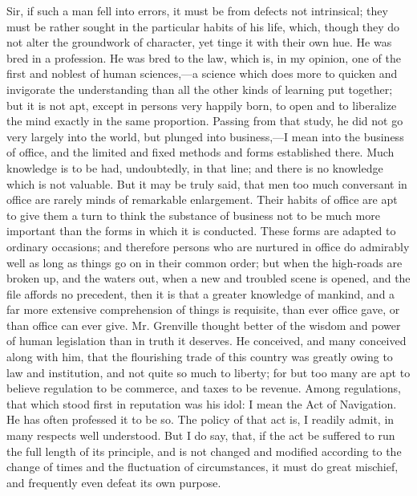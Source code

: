 Sir, if such a man fell into errors, it must be from defects not intrinsical; they must be rather sought in the particular habits of his life, which, though they do not alter the groundwork of character, yet tinge it with their own hue. He was bred in a profession. He was bred to the law, which is, in my opinion, one of the first and noblest of human sciences,—a science which does more to quicken and invigorate the understanding than all the other kinds of learning put together; but it is not apt, except in persons very happily born, to open and to liberalize the mind exactly in the same proportion. Passing from that study, he did not go very largely into the world, but plunged into business,—I mean into the business of office, and the limited and fixed methods and forms established there. Much knowledge is to be had, undoubtedly, in that line; and there is no knowledge which is not valuable. But it may be truly said, that men too much conversant in office are rarely minds of remarkable enlargement. Their habits of office are apt to give them a turn to think the substance of business not to be much more important than the forms in which it is conducted. These forms are adapted to ordinary occasions; and therefore persons who are nurtured in office do admirably well as long as things go on in their common order; but when the high-roads are broken up, and the waters out, when a new and troubled scene is opened, and the file affords no precedent, then it is that a greater knowledge of mankind, and a far more extensive comprehension of things is requisite, than ever office gave, or than office can ever give. Mr. Grenville thought better of the wisdom and power of human legislation than in truth it deserves. He conceived, and many conceived along with him, that the flourishing trade of this country was greatly owing to law and institution, and not quite so much to liberty; for but too many are apt to believe regulation to be commerce, and taxes to be revenue. Among regulations, that which stood first in reputation was his idol: I mean the Act of Navigation. He has often professed it to be so. The policy of that act is, I readily admit, in many respects well understood. But I do say, that, if the act be suffered to run the full length of its principle, and is not changed and modified according to the change of times and the fluctuation of circumstances, it must do great mischief, and frequently even defeat its own purpose.

